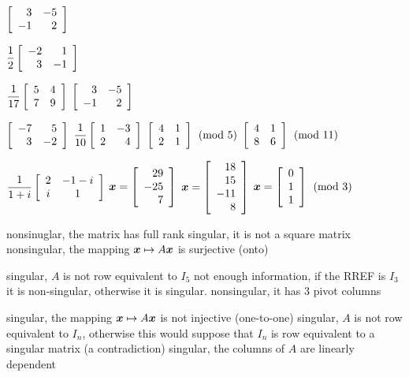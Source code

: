 
\begin{enumerate}[!HW!, start=1]
\begin{multicols}{4}
\item $\mtx{rr}{3&-5\\-1&2}$ %
\item $\dfrac{1}{2}\mtx{rr}{-2&1\\3&-1}$ %
\item $\dfrac{1}{17}\mtx{rr}{5&4\\7&9}$ %
\itemspade $\mtx{rr}{3&-5\\-1&2}$
\end{multicols}
\begin{multicols}{4}
\itemspade $\mtx{rr}{-7&5\\3&-2}$
\itemspade $\dfrac{1}{10}\mtx{rr}{1&-3\\2&4}$
\itemspade \mbox{$\mtx{rr}{4&1\\2&1}\pmod 5$}
\itemspade \mbox{$\mtx{rr}{4&1\\8&6} \pmod{11}$}
\end{multicols}
\begin{multicols}{4}
\itemspade $\dfrac{1}{1+i}\mtx{cc}{2& -1-i\\i&1}$
\itemspade $\bb x = %
\vr{29\\-25\\7}$
\itemspade $\bb x = %
\vr{18\\15\\-11\\8}$
\itemspade \mbox{$\bb x = %
\vr{0\\1\\1}\pmod 3$}
\end{multicols}

\begin{multicols}{3}
\itemspade nonsinuglar, the matrix has full rank
\itemspade singular, it is not a square matrix
\itemspade nonsingular, the mapping $\bb x\mapsto A\bb x$ is surjective (onto)
\end{multicols}
\begin{multicols}{3}
\itemspade singular, $A$ is not row equivalent to $I_5$\columnbreak
\itemspade not enough information, if the RREF is $I_3$ it is non-singular, otherwise it is singular.\columnbreak
\itemspade nonsingular, it has $3$ pivot columns
\end{multicols}
\begin{multicols}{3}
\itemspade singular, the mapping $\bb x\mapsto A\bb x$ is not injective (one-to-one)\columnbreak
\itemspade singular, $A$ is not row equivalent to $I_n$, otherwise this would suppose that $I_n$ is row equivalent to a singular matrix (a contradiction)\columnbreak
\itemspade singular, the columns of $A$ are linearly dependent
\end{multicols}


\end{enumerate}
